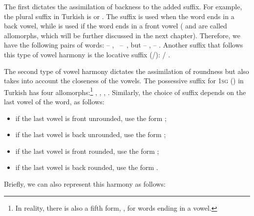 \begin{refsection}
\begin{mysolution}
The first dictates the assimilation of backness to the added suffix. For example, the plural suffix in Turkish is  or . The suffix  is used when the word ends in a back vowel, while  is used if the word ends in a front vowel ( and  are called allomorphs, which will be further discussed in the next chapter). Therefore, we have the following pairs of words:  -- , \mbox{ -- }, but  -- ,  -- . Another suffix that follows this type of vowel harmony is the locative suffix (/):  / .

The second type of vowel harmony dictates the assimilation of roundness but also takes into account the closeness of the vowels. The possessive suffix for 1\textsc{sg} () in Turkish has four allomorphs:\footnote{In reality, there is also a fifth form, , for words ending in a vowel.} , , , . Similarly, the choice of suffix depends on the last vowel of the word, as follows:

\begin{itemize}
\item if the last vowel is front unrounded, use the form ;
\item if the last vowel is back unrounded, use the form ;
\item if the last vowel is front rounded, use the form ;
\item if the last vowel is back rounded, use the form .
\end{itemize}

 Briefly, we can also represent this harmony as follows:



\end{mysolution}
\end{refsection}
